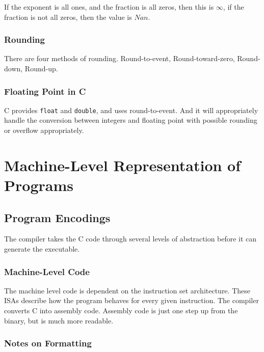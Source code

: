 \documentclass[10pt]{armath}
\newcommand{\s}[1]{\texttt{#1}}
\begin{document}
If the exponent is all ones, and the fraction is all zeros, then this is
$\infty$, if the fraction is not all zeros, then the value is $Nan$.

\subsubsection{Rounding}%
\label{ssub:rounding}

There are four methods of rounding. Round-to-event, Round-toward-zero,
Round-down, Round-up.

\subsubsection{Floating Point in C}%
\label{ssub:floating_point_in_c}

C provides \s{float} and \s{double}, and uses round-to-event. And it will
appropriately handle the conversion between integers and floating point with
possible rounding or overflow appropriately.

\section{Machine-Level Representation of Programs}%
\label{sec:machine_level_representation_of_programs}

\subsection{Program Encodings}%
\label{sub:program_encodings}

The compiler takes the C code through several levels of abstraction before it
can generate the executable.

\subsubsection{Machine-Level Code}%
\label{ssub:machine_level_code}

The machine level code is dependent on the instruction set architecture. These
ISAs describe how the program behaves for every given instruction. The compiler
converts C into assembly code. Assembly code is just one step up from the
binary, but is much more readable.

\subsubsection{Notes on Formatting}%
\label{ssub:notes_on_formatting}
\end{document}
